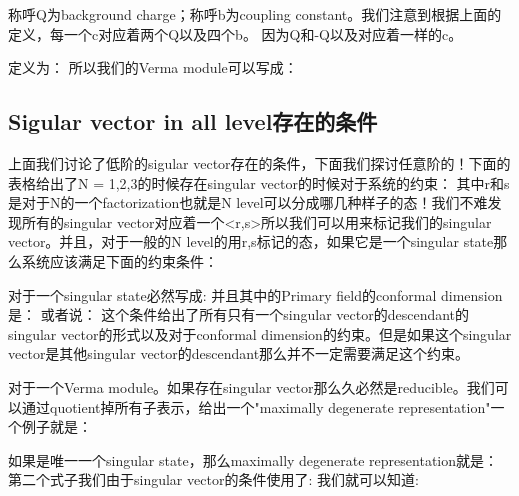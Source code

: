 称呼Q为background charge；称呼b为coupling constant。我们注意到根据上面的定义，每一个c对应着两个Q以及四个b。
因为Q和-Q以及对应着一样的c。

定义为：
所以我们的Verma module可以写成：

\subsection{Sigular vector in all level存在的条件}

上面我们讨论了低阶的sigular vector存在的条件，下面我们探讨任意阶的！下面的表格给出了N = 1,2,3的时候存在singular vector的时候对于系统的约束：
其中r和s是对于N的一个factorization也就是N level可以分成哪几种样子的态！我们不难发现所有的singular vector对应着一个<r,s>所以我们可以用来标记我们的singular vector。并且，对于一般的N level的用r,s标记的态，如果它是一个singular state那么系统应该满足下面的约束条件：

对于一个singular state必然写成:
并且其中的Primary field的conformal dimension是：
或者说：
这个条件给出了所有只有一个singular vector的descendant的singular vector的形式以及对于conformal dimension的约束。但是如果这个singular vector是其他singular vector的descendant那么并不一定需要满足这个约束。

对于一个Verma module。如果存在singular vector那么久必然是reducible。我们可以通过quotient掉所有子表示，给出一个"maximally degenerate representation"一个例子就是：

如果是唯一一个singular state，那么maximally degenerate representation就是：
第二个式子我们由于singular vector的条件使用了:
我们就可以知道:

